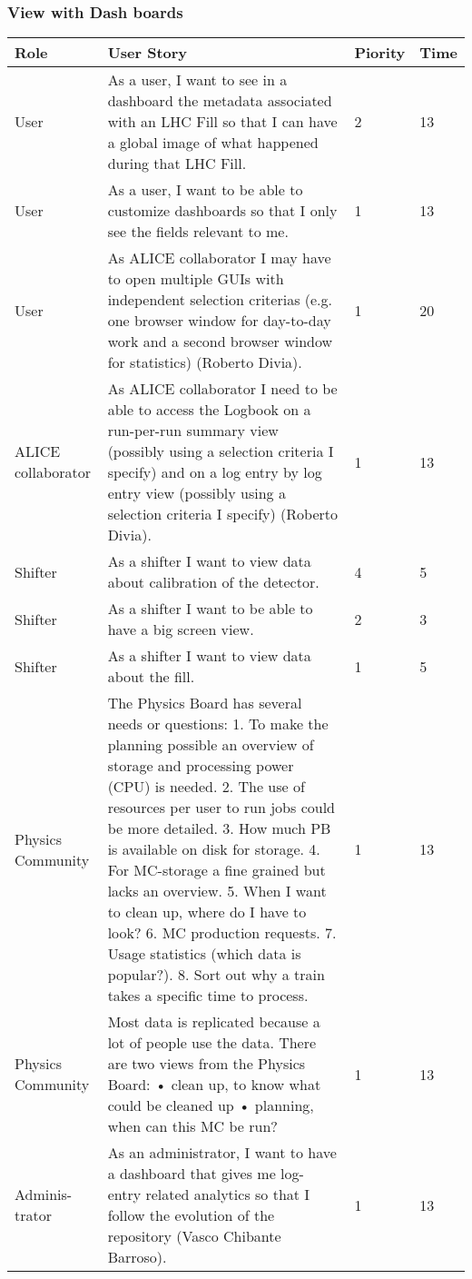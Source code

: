\subsubsection{View with Dash boards}
\begin{longtable}{ | p{2cm} | p{8cm} | p{1.5cm} | l |}
\hline
Role & User Story & Piority & Time \\ \hline
User &  As a user, I want to see in a dashboard the metadata associated with
an LHC Fill so that I can have a global image of what happened during that LHC Fill. & 2 & 13 \\ \hline
User &  As a user, I want to be able to customize dashboards so that I only see the fields relevant to me. & 1 & 13 \\ \hline
User &  As ALICE collaborator I may have to open multiple GUIs with independent selection criterias (e.g. one browser window for day-to-day work and a second browser window for statistics) (Roberto Divia). & 1 & 20 \\ \hline
ALICE collaborator &  As ALICE collaborator I need to be able to access the Logbook on a run-per-run summary view (possibly using a selection criteria I specify) and on a log entry by log entry view (possibly using a selection criteria
I specify) (Roberto Divia). & 1 & 13 \\ \hline
Shifter & As a shifter I want to view data about calibration of the detector. & 4 & 5 \\ \hline
Shifter & As a shifter I want to be able to have a big screen view. & 2 & 3 \\ \hline
Shifter & As a shifter I want to view data about the fill. & 1 & 5\\ \hline
Physics Community & The Physics Board has several needs or questions:
1. To make the planning possible an overview of storage and processing
power (CPU) is needed.
2. The use of resources per user to run jobs could be more detailed.
3. How much PB is available on disk for storage.
4. For MC-storage a fine grained but lacks an overview.
5. When I want to clean up, where do I have to look?
6. MC production requests.
7. Usage statistics (which data is popular?).
8. Sort out why a train takes a specific time to process. & 1 & 13\\ \hline
Physics Community & Most data is replicated because a lot of people use the data.
There are two views from the Physics Board:
• clean up, to know what could be cleaned up
• planning, when can this MC be run?
& 1 & 13 \\ \hline
Adminis-trator & As an administrator, I want to have a dashboard that gives me log-
entry related analytics so that I follow the evolution of the repository
(Vasco Chibante Barroso). & 1 & 13 \\ \hline

\end{longtable}

